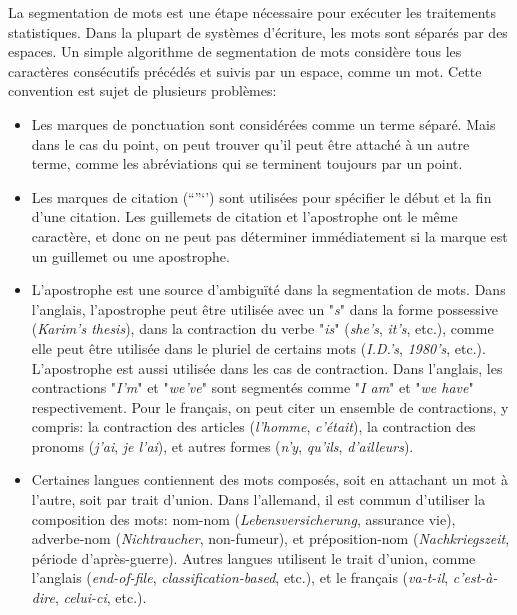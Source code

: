 \documentclass[a4paper,12pt,oneside]{../use/ESIthesis}
\begin{document}
La segmentation de mots est une étape nécessaire pour exécuter les traitements statistiques. 
Dans la plupart de systèmes d'écriture, les mots sont séparés par des espaces. 
Un simple algorithme de segmentation de mots considère tous les caractères consécutifs précédés et suivis par un espace, comme un mot. 
Cette convention est sujet de plusieurs problèmes:
%
\begin{itemize}
%
\item Les marques de ponctuation sont considérées comme un terme séparé. 
Mais dans le cas du point, on peut trouver qu'il peut être attaché à un autre terme, comme les abréviations qui se terminent toujours par un point. 
%
\item Les marques de citation (\textquotedblleft \textquotedblright \textquoteleft \textquoteright) sont utilisées pour spécifier le début et la fin d'une citation. 
Les guillemets de citation et l'apostrophe ont le même caractère, et donc on ne peut pas déterminer immédiatement si la marque est un guillemet ou une apostrophe. 
%
\item L'apostrophe est une source d'ambiguïté dans la segmentation de mots. 
Dans l'anglais, l'apostrophe peut être utilisée avec un "\textit{s}" dans la forme possessive (\textit{Karim's thesis}), dans la contraction du verbe "\textit{is}" (\textit{she's}, \textit{it's}, etc.), comme elle peut être utilisée dans le pluriel de certains mots (\textit{I.D.'s}, \textit{1980's}, etc.). 
L'apostrophe est aussi utilisée dans les cas de contraction. 
Dans l'anglais, les contractions "\textit{I'm}" et "\textit{we've}" sont segmentés comme "\textit{I am}" et "\textit{we have}" respectivement. 
Pour le français, on peut citer un ensemble de contractions, y compris: la contraction des articles (\textit{l'homme}, \textit{c'était}), la contraction des pronoms (\textit{j'ai}, \textit{je l'ai}), et autres formes (\textit{n'y}, \textit{qu'ils}, \textit{d'ailleurs}).
%
\item Certaines langues contiennent des mots composés, soit en attachant un mot à l'autre, soit par trait d'union. 
Dans l'allemand, il est commun d'utiliser la composition des mots: nom-nom (\textit{Lebensversicherung}, assurance vie), adverbe-nom (\textit{Nichtraucher}, non-fumeur), et préposition-nom (\textit{Nachkriegszeit}, période d'après-guerre). 
Autres langues utilisent le trait d'union, comme l'anglais (\textit{end-of-file}, \textit{classification-based}, etc.), et le français (\textit{va-t-il}, \textit{c'est-à-dire}, \textit{celui-ci}, etc.). 
%
\end{itemize}
\end{document}
